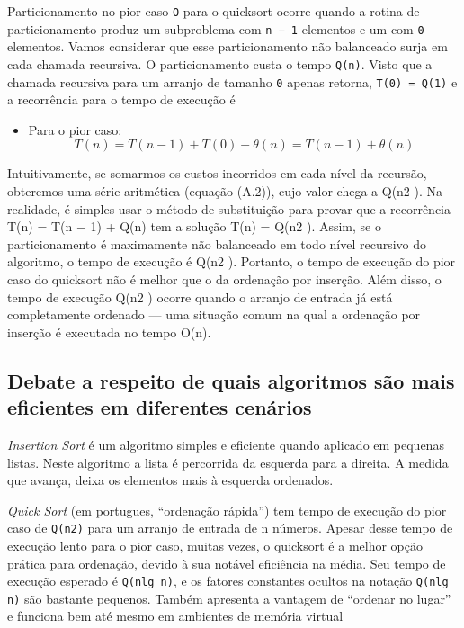 \documentclass{article}
\begin{document}
Particionamento no pior caso \texttt{O} para o quicksort ocorre quando a rotina de particionamento produz um subproblema com \texttt{n − 1} elementos e um com \texttt{0} elementos. Vamos considerar que esse particionamento não balanceado surja em cada chamada recursiva. O particionamento custa o tempo \texttt{Q(n)}. Visto que a chamada recursiva para um arranjo de tamanho \texttt{0} apenas retorna, \texttt{T(0) = Q(1)} e a recorrência para o tempo de execução é
\begin{itemize}
  \item{Para o pior caso:}
    \begin{equation}
      T(n) = T(n-1) + T(0) + \theta (n) = T(n-1) + \theta (n)
    \end{equation}
\end{itemize}
Intuitivamente, se somarmos os custos incorridos em cada nível da recursão, obteremos uma série aritmética (equação (A.2)), cujo valor chega a Q(n2 ). Na realidade, é simples usar o método de substituição para provar que a recorrência T(n) = T(n − 1) + Q(n) tem a solução T(n) = Q(n2 ).  Assim, se o particionamento é maximamente não balanceado em todo nível recursivo do algoritmo, o tempo de execução é Q(n2 ). Portanto, o tempo de execução do pior caso do quicksort não é melhor que o da ordenação por inserção. Além disso, o tempo de execução Q(n2 ) ocorre quando o arranjo de entrada já está completamente ordenado — uma situação comum na qual a ordenação por inserção é executada no tempo O(n).

\subsection{Debate a respeito de quais algoritmos são mais eficientes em diferentes cenários}
\textit{Insertion Sort} é um algoritmo simples e eficiente quando aplicado em pequenas listas. Neste algoritmo a lista é percorrida da esquerda para a direita. A medida que avança, deixa os elementos mais à esquerda ordenados.

\textit{Quick Sort} (em portugues, ``ordenação rápida'') tem tempo de execução do pior caso de \texttt{Q(n2)} para um arranjo de entrada de n números. Apesar desse tempo de execução lento para o pior caso, muitas vezes, o quicksort é a melhor opção prática para ordenação, devido à sua notável eficiência na média. Seu tempo de execução esperado é \texttt{Q(nlg n)}, e os fatores constantes ocultos na notação \texttt{Q(nlg n)} são bastante pequenos. Também apresenta a vantagem de ``ordenar no lugar'' e funciona bem até mesmo em ambientes de memória virtual
\end{document}
